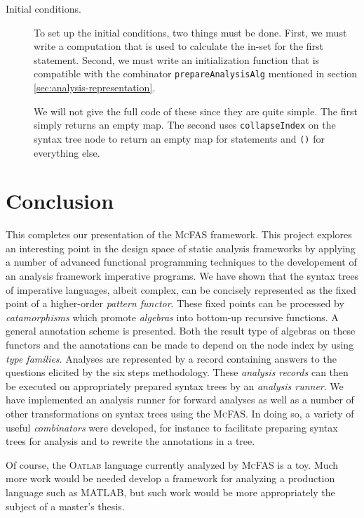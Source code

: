 \documentclass[letterpaper,11pt]{article}
\newcommand{\mcfas}{\textsc{McFAS}}
\newcommand{\matlab}{MATLAB}
\newcommand{\oatlab}{\textsc{Oatlab}}
\newcommand{\code}{\texttt}
\begin{document}
\begin{description}
    \item[Initial conditions.]
        To set up the initial conditions, two things must be done. First, we
        must write a computation that is used to calculate the in-set for the
        first statement. Second, we must write an initialization function that
        is compatible with the combinator \code{prepareAnalysisAlg} mentioned
        in section \ref{sec:analysis-representation}.

        We will not give the full code of these since they are quite simple.
        The first simply returns an empty map. The second uses
        \code{collapseIndex} on the syntax tree node to return an empty map for
        statements and \code{()} for everything else.
\end{description}

\section{Conclusion}

This completes our presentation of the \mcfas{} framework. This project
explores an interesting point in the design space of static analysis frameworks
by applying a number of advanced functional programming techniques to the
developement of an analysis framework imperative programs. We have shown that
the syntax trees of imperative languages, albeit complex, can be concisely
represented as the fixed point of a higher-order \emph{pattern functor}. These
fixed points can be processed by \emph{catamorphisms} which promote
\emph{algebras} into bottom-up recursive functions. A general annotation scheme
is presented. Both the result type of algebras on these functors and the
annotations can be made to depend on the node index by using \emph{type
families}. Analyses are represented by a record containing answers to the
questions elicited by the six steps methodology. These \emph{analysis records}
can then be executed on appropriately prepared syntax trees by an
\emph{analysis runner}. We have implemented an analysis runner for forward
analyses as well as a number of other transformations on syntax trees using the
\mcfas. In doing so, a variety of useful \emph{combinators} were developed, for
instance to facilitate preparing syntax trees for analysis and to rewrite the
annotations in a tree.

Of course, the \oatlab{} language currently analyzed by \mcfas{} is a toy. Much
more work would be needed develop a framework for analyzing a production
language such as \matlab, but such work would be more appropriately the subject
of a master's thesis.
\end{document}

